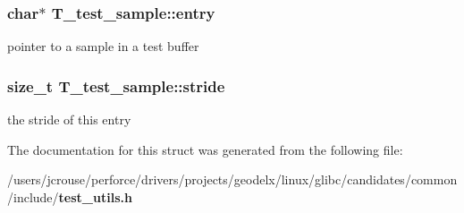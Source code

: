 \subsubsection{\setlength{\rightskip}{0pt plus 5cm}char$\ast$ T\_\-test\_\-sample::entry}\label{structT__test__sample_m0}


pointer to a sample in a test buffer 
\subsubsection{\setlength{\rightskip}{0pt plus 5cm}size\_\-t T\_\-test\_\-sample::stride}\label{structT__test__sample_m2}


the stride of this entry 

The documentation for this struct was generated from the following file:\begin{CompactItemize}
\item 
/users/jcrouse/perforce/drivers/projects/geodelx/linux/glibc/candidates/common/include/{\bf test\_\-utils.h}\end{CompactItemize}
